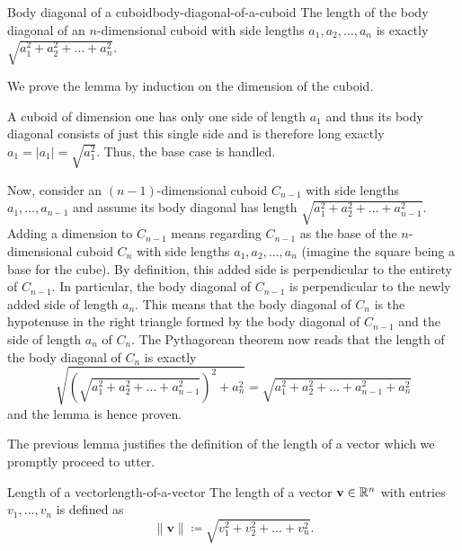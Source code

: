 \begin{lemma}{Body diagonal of a cuboid}{body-diagonal-of-a-cuboid}
 The length of the body diagonal of an $n$-dimensional cuboid with side lengths
 $a_1,a_2,\ldots,a_n$ is exactly $\sqrt{a_1^2 + a_2^2 + \ldots + a_n^2}$.
\end{lemma}
\begin{lemproof}
 We prove the lemma by induction on the dimension of the cuboid.

 A cuboid of dimension one has only one side of length $a_1$ and thus its body
 diagonal consists of just this single side and is therefore long exactly $a_1 =
 |a_1| = \sqrt{a_1^2}$. Thus, the base case is handled.

 Now, consider an $(n-1)$-dimensional cuboid $C_{n-1}$ with side lengths
 $a_1,\ldots,a_{n-1}$ and assume its body diagonal has length $\sqrt{a_1^2 +
 a_2^2 + \ldots + a_{n-1}^2}$. Adding a dimension to $C_{n-1}$ means regarding
 $C_{n-1}$ as the base of the $n$-dimensional cuboid $C_n$ with side lengths
 $a_1,a_2,\ldots,a_n$ (imagine the square being a base for the cube). By
 definition, this added side is perpendicular to the entirety of $C_{n-1}$. In
 particular, the body diagonal of $C_{n-1}$ is perpendicular to the newly added
 side of length $a_n$. This means that the body diagonal of $C_n$ is the
 hypotenuse in the right triangle formed by the body diagonal of $C_{n-1}$ and
 the side of length $a_n$ of $C_n$. The Pythagorean theorem now reads that the
 length of the body diagonal of $C_n$ is exactly
 \[
  \sqrt{\left( \sqrt{a_1^2 + a_2^2 + \ldots + a_{n-1}^2} \right)^2 + a_n^2} =
  \sqrt{a_1^2 + a_2^2 + \ldots + a_{n-1}^2 + a_n^2}
 \]
 and the lemma is hence proven.
\end{lemproof}

The previous lemma justifies the definition of the length of a vector which we
promptly proceed to utter.

\begin{definition}{Length of a vector}{length-of-a-vector}
 The length of a vector $\mathbf{v} \in \mathbb{R}^{n}$ with entries $v_1,\ldots,v_n$ is
 defined as
 \[
  \|\mathbf{v}\| \coloneqq \sqrt{v_1^2 + v_2^2 + \ldots + v_n^2}.
 \]
\end{definition}

